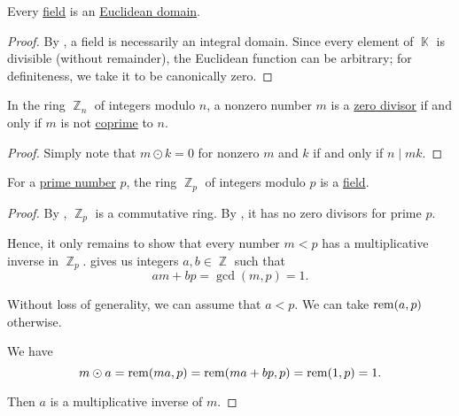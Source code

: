 \begin{proposition}\label{thm:field_is_euclidean_domain}
  Every \hyperref[def:field]{field} is an \hyperref[def:euclidean_domain]{Euclidean domain}.
\end{proposition}
\begin{proof}
  By , a field is necessarily an integral domain. Since every element of \( \BbbK \) is divisible (without remainder), the Euclidean function can be arbitrary; for definiteness, we take it to be canonically zero.
\end{proof}

\begin{lemma}\label{thm:ring_of_integers_modulo_zero_divisors}
  In the ring \hyperref[thm:ring_of_integers_modulo]{\( \BbbZ_n \)} of integers modulo \( n \), a nonzero number \( m \) is a \hyperref[def:divisibility]{zero divisor} if and only if \( m \) is not \hyperref[def:coprime_numbers]{coprime} to \( n \).
\end{lemma}
\begin{proof}
  Simply note that \( m \odot k = 0 \) for nonzero \( m \) and \( k \) if and only if \( n \mid mk \).
\end{proof}

\begin{proposition}\label{thm:ring_of_integers_modulo_prime_is_field}
  For a \hyperref[def:prime_number]{prime number} \( p \), the ring \hyperref[thm:ring_of_integers_modulo]{\( \BbbZ_p \)} of integers modulo \( p \) is a \hyperref[def:field]{field}.
\end{proposition}
\begin{proof}
  By , \( \BbbZ_p \) is a commutative ring. By , it has no zero divisors for prime \( p \).

  Hence, it only remains to show that every number \( m < p \) has a multiplicative inverse in \( \BbbZ_p \).  gives us integers \( a, b \in \BbbZ \) such that
  \begin{equation*}
    am + bp = \gcd(m, p) = 1.
  \end{equation*}

  Without loss of generality, we can assume that \( a < p \). We can take \( \operatorname{rem}(a, p) \) otherwise.

  We have
  \begin{equation*}
    m \odot a = \operatorname{rem}(ma, p) = \operatorname{rem}(ma + bp, p) = \operatorname{rem}(1, p) = 1.
  \end{equation*}

  Then \( a \) is a multiplicative inverse of \( m \).
\end{proof}

